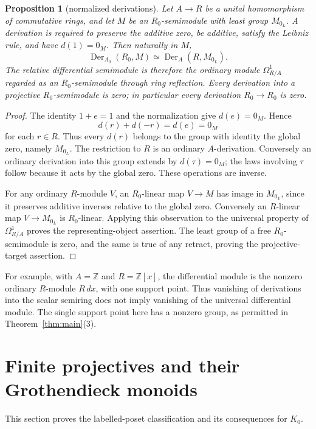 \documentclass[11pt]{amsart}
\newcommand{\Z}{\mathbb Z}
\newtheorem{proposition}[theorem]{Proposition}
\theoremstyle{definition}
\theoremstyle{remark}
\begin{document}
\begin{proposition}[normalized derivations]\label{prop:derivations}
Let $A\to R$ be a unital homomorphism of commutative rings, and let $M$ be an $R_0$-semimodule with least group $M_{0_L}$. A derivation is required to preserve the additive zero, be additive, satisfy the Leibniz rule, and have $d(1)=0_M$. Then naturally in $M$,
\[
 \operatorname{Der}_{A_0}(R_0,M)
 \simeq \operatorname{Der}_{A}(R,M_{0_L}).
\]
The relative differential semimodule is therefore the ordinary module $\Omega^1_{R/A}$ regarded as an $R_0$-semimodule through ring reflection. Every derivation into a projective $R_0$-semimodule is zero; in particular every derivation $R_0\to R_0$ is zero.
\end{proposition}
\begin{proof}
The identity $1+e=1$ and the normalization give $d(e)=0_M$. Hence
\[
 d(r)+d(-r)=d(e)=0_M
\]
for each $r\in R$. Thus every $d(r)$ belongs to the group with identity the global zero, namely $M_{0_L}$. The restriction to $R$ is an ordinary $A$-derivation. Conversely an ordinary derivation into this group extends by $d(\tau)=0_M$; the laws involving $\tau$ follow because it acts by the global zero. These operations are inverse.

For any ordinary $R$-module $V$, an $R_0$-linear map $V\to M$ has image in $M_{0_L}$, since it preserves additive inverses relative to the global zero. Conversely an $R$-linear map $V\to M_{0_L}$ is $R_0$-linear. Applying this observation to the universal property of $\Omega^1_{R/A}$ proves the representing-object assertion. The least group of a free $R_0$-semimodule is zero, and the same is true of any retract, proving the projective-target assertion.
\end{proof}

For example, with $A=\Z$ and $R=\Z[x]$, the differential module is the nonzero ordinary $R$-module $R\,dx$, with one support point. Thus vanishing of derivations into the scalar semiring does not imply vanishing of the universal differential module. The single support point here has a nonzero group, as permitted in Theorem~\ref{thm:main}(3).

\section{Finite projectives and their Grothendieck monoids}\label{sec:projectives}
This section proves the labelled-poset classification and its consequences for $K_0$.
\end{document}
